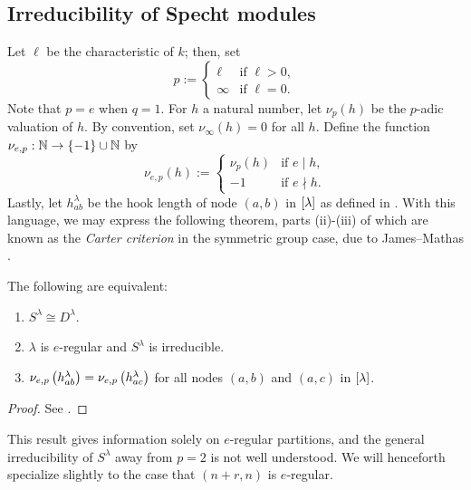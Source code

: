 \documentclass{amsart}
\begin{document}
  \subsection{Irreducibility of Specht modules}
  Let $\ell$ be the characteristic of $k$;
  then, set
  \[
    p := \begin{cases}
      \ell & \text{if }\ell > 0,\\
      \infty & \text{if }\ell = 0.
    \end{cases}
  \]
  Note that $p = e$ when $q = 1$.
  For $h$ a natural number, let $\nu_p(h)$ be the $p$-adic valuation of $h$.
  By convention, set $\nu_\infty(h) = 0$ for all $h$.
  Define the function $\nu_{e,p} : \mathbb{N} \rightarrow \left\{ -1 \right\} \cup \mathbb{N}$ by
  \[
    \nu_{e,p}(h) := \begin{cases}
      \nu_p(h) & \text{if }e \mid h,\\
      -1 & \text{if }e \nmid h.
    \end{cases}
  \]
  Lastly, let $h_{ab}^\lambda$ be the hook length of node $(a,b)$ in $\left[ \lambda \right]$ as defined in \cite{Kleshchev}.
  With this language, we may express the following theorem, parts (ii)-(iii) of which are known as the \emph{Carter criterion} in the symmetric group case, due to James--Mathas \cite{Mathas-book}.
  \begin{theorem}\label{Mathas Irreducibility}
    The following are equivalent:
    \begin{enumerate}[label={(\roman*)}]
      \item $S^{\lambda} \cong D^{\lambda}$.
      \item $\lambda$ is $e$-regular and $S^\lambda$ is irreducible.
      \item $\nu_{e,p}\left( h_{ab}^\lambda \right) = \nu_{e,p}\left( h_{ac}^\lambda \right)$ for all nodes $(a,b)$ and $(a,c)$ in $\left[ \lambda \right]$.
    \end{enumerate}
  \end{theorem}
  \begin{proof}
    See \cite[Thm~5.42]{Mathas-book}.
  \end{proof}
  This result gives information solely on $e$-regular partitions, and the general irreducibility of $S^\lambda$ away from $p=2$ is not well understood.
  We will henceforth specialize slightly to the case that $(n+r,n)$ is $e$-regular. 
\end{document}
